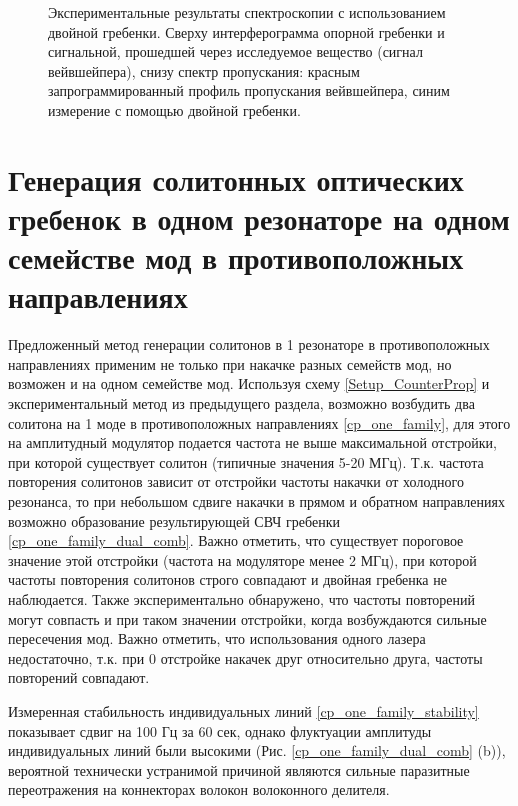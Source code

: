 \begin{figure}[ht]
\begin{minipage}[ht]{1\linewidth}
\end{minipage}
\caption{Экспериментальные результаты спектроскопии с использованием двойной гребенки. Сверху интерферограмма опорной гребенки и сигнальной, прошедшей через исследуемое вещество (сигнал вейвшейпера), снизу спектр пропускания: красным запрограммированный профиль пропускания вейвшейпера, синим измерение с помощью двойной гребенки.}
\label{fig3_spectroscopy}
\end{figure}


\section{Генерация солитонных оптических гребенок в одном резонаторе на одном семействе мод в противоположных направлениях}

Предложенный метод генерации солитонов в 1 резонаторе в противоположных направлениях применим не только при накачке разных семейств мод, но возможен и на одном семействе мод. Используя схему \ref{Setup_CounterProp} и экспериментальный метод из предыдущего раздела, возможно возбудить два солитона на 1 моде в противоположных направлениях \ref{cp_one_family}, для этого на амплитудный модулятор подается частота не выше максимальной отстройки, при которой существует солитон (типичные значения 5-20 МГц). Т.к. частота повторения солитонов зависит от отстройки частоты накачки от холодного резонанса, то при небольшом сдвиге накачки в прямом и обратном направлениях возможно образование результирующей СВЧ гребенки \ref{cp_one_family_dual_comb}. Важно отметить, что существует пороговое значение этой отстройки (частота на модуляторе менее 2 МГц), при которой частоты повторения солитонов строго совпадают и двойная гребенка не наблюдается. Также экспериментально обнаружено, что частоты повторений могут совпасть и при таком значении отстройки, когда возбуждаются сильные пересечения мод. Важно отметить, что использования одного лазера недостаточно, т.к. при 0 отстройке накачек друг относительно друга, частоты повторений совпадают.

Измеренная стабильность индивидуальных линий \ref{cp_one_family_stability} показывает сдвиг на 100 Гц за 60 сек, однако флуктуации амплитуды индивидуальных линий были высокими (Рис. \ref{cp_one_family_dual_comb} (b)), вероятной технически устранимой причиной являются сильные паразитные переотражения на коннекторах волокон волоконного делителя.

